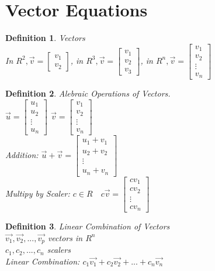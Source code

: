\documentclass[a4paper,12pt]{book}
\theoremstyle{defn}
\newtheorem{defn}{Definition}[section]
\theoremstyle{expl}
\begin{document}
\section{Vector Equations}
\begin{defn}
\textup{Vectors\\
In $R^2, \vec{v} = \left[\begin{array}{c} v_1 \\ v_2 \end{array}\right]$, in $R^3, \vec{v}=\left[\begin{array}{c} v_1 \\ v_2 \\v_3\end{array}\right]$, in $R^n, \vec{v} =\left[\begin{array}{c} v_1 \\ v_2 \\ \vdots \\ v_n\end{array}\right]$}\end{defn}
\begin{defn}
\textup{
Alebraic Operations of Vectors.\\
$\vec{u}=\left[\begin{array}{c} u_1\\u_2\\\vdots\\u_n \end{array}\right]$
$\vec{v}=\left[\begin{array}{c} v_1\\v_2\\\vdots\\v_n \end{array}\right]$\\
Addition: $\vec{u}+\vec{v}= \left[\begin{array}{c} u_1+v_1\\u_2+v_2\\\vdots\\u_n+v_n \end{array}\right]$\\
Multipy by Scaler: $c\in R\quad c\vec{v}=\left[\begin{array}{c} cv_1\\cv_2\\\vdots\\cv_n \end{array}\right]$
}\end{defn}

\begin{defn}
\textup{
Linear Combination of Vectors\\
$\vec{v_1},\vec{v_2},...,\vec{v_p}$ vectors in $R^n$\\
$c_1,c_2,...,c_n$ scalers\\
Linear Combination: $c_1\vec{v_1}+c_2\vec{v_2}+...+c_n\vec{v_n}$
}\end{defn}
\end{document}
